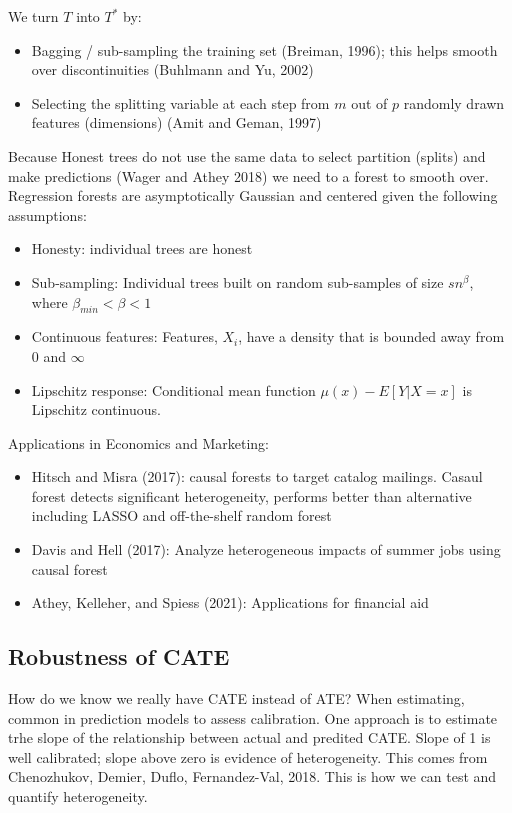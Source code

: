 \documentclass{article}
\begin{document}
We turn $T$ into $T^*$ by: 
\begin{itemize}
    \item Bagging / sub-sampling the training set (Breiman, 1996); this helps smooth over discontinuities (Buhlmann and Yu, 2002)
    \item Selecting the splitting variable at each step from $m$ out of $p$ randomly drawn features (dimensions) (Amit and Geman, 1997)
\end{itemize}

Because Honest trees do not use the same data to select partition (splits) and make predictions (Wager and Athey 2018) we need to a forest to smooth over. Regression forests are asymptotically Gaussian and centered given the following assumptions:

\begin{itemize}
    \item Honesty: individual trees are honest
    \item Sub-sampling: Individual trees built on random sub-samples of size $s  n^\beta$, where $\beta_{min} < \beta < 1$
    \item Continuous features: Features, $X_i$, have a density that is bounded away from 0 and $\infty$ 
    \item Lipschitz response: Conditional mean function $\mu (x) - E [Y | X = x]$ is Lipschitz continuous.
\end{itemize}

Applications in Economics and Marketing:
\begin{itemize}
    \item Hitsch and Misra (2017): causal forests to target catalog mailings. Casaul forest detects significant heterogeneity, performs better than alternative including LASSO and off-the-shelf random forest
    \item Davis and Hell (2017): Analyze heterogeneous impacts of summer jobs using causal forest
    \item Athey, Kelleher, and Spiess (2021): Applications for financial aid
\end{itemize}

\subsection{Robustness of CATE}

How do we know we really have CATE instead of ATE? When estimating, common in prediction models to assess calibration. One approach is to estimate trhe slope of the relationship between actual and predited CATE. Slope of 1 is well calibrated; slope above zero is evidence of heterogeneity. This comes from Chenozhukov, Demier, Duflo, Fernandez-Val, 2018. This is how we can test and quantify heterogeneity.
\end{document}
